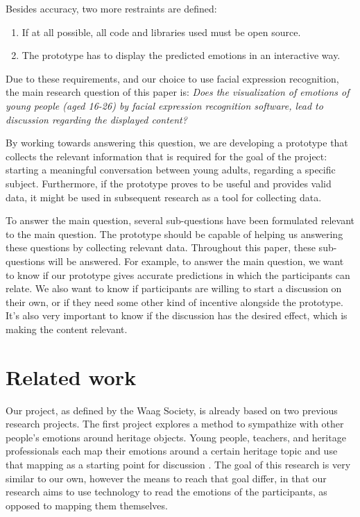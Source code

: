 \documentclass[sigconf]{acmart}
\begin{document}
Besides accuracy, two more restraints are defined:
\begin{enumerate}
    \item{If at all possible, all code and libraries used must be open source.}
    \item{The prototype has to display the predicted emotions in an interactive way.}
\end{enumerate}
Due to these requirements, and our choice to use facial expression recognition, the main research question
of this paper is: \emph{Does the visualization of emotions of young people (aged 16-26) by facial expression
recognition software, lead to discussion regarding the displayed content?}

By working towards answering this question, we are developing a prototype that collects the relevant information
that is required for the goal of the project: starting a meaningful conversation between young adults, regarding
a specific subject. Furthermore, if the prototype proves to be useful and provides valid data, it might be used in subsequent
research as a tool for collecting data.

To answer the main question, several sub-questions have been formulated relevant to the main question. 
The prototype should be capable of helping us answering these questions by collecting relevant data. 
Throughout this paper, these sub-questions will be answered. For example, to answer the main question, 
we want to know if our prototype gives accurate predictions in which the participants can relate. 
We also want to know if participants are willing to start a discussion on their own, or if they need some 
other kind of incentive alongside the prototype. It's also very important to know if the discussion has the 
desired effect, which is making the content relevant.



\section{Related work}
Our project, as defined by the Waag Society, is already based on two previous research projects. The first
project explores a method to sympathize with other people's emotions around heritage objects. Young people,
teachers, and heritage professionals each map their emotions around a certain heritage topic and use that
mapping as a starting point for discussion \cite{emotionnetworking2017}. The goal of this research is very
similar to our own, however the means to reach that goal differ, in that our research aims to use technology
to read the emotions of the participants, as opposed to mapping them themselves.
\end{document}
